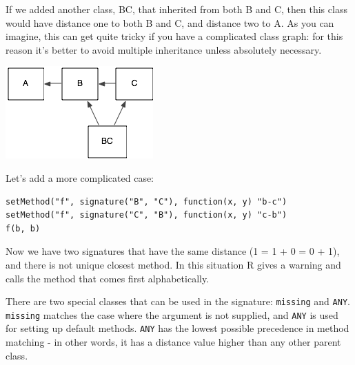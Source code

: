 If we added another class, BC, that inherited from both B and C, then
this class would have distance one to both B and C, and distance two to
A. As you can imagine, this can get quite tricky if you have a
complicated class graph: for this reason it's better to avoid multiple
inheritance unless absolutely necessary.

\includegraphics{diagrams/class-graph-2.png}

\begin{Shaded}
\begin{Highlighting}[]
\NormalTok{(}\NormalTok{, } \NormalTok{(}\NormalTok{, }\NormalTok{))}
\StringTok{ }\NormalTok{(}\NormalTok{, }\NormalTok{)}
\end{Highlighting}
\end{Shaded}

Let's add a more complicated case:

\begin{verbatim}
setMethod("f", signature("B", "C"), function(x, y) "b-c")
setMethod("f", signature("C", "B"), function(x, y) "c-b")
f(b, b)
\end{verbatim}

Now we have two signatures that have the same distance (1 = 1 + 0 = 0 +
1), and there is not unique closest method. In this situation R gives a
warning and calls the method that comes first alphabetically.

There are two special classes that can be used in the signature:
\texttt{missing} and \texttt{ANY}. \texttt{missing} matches the case
where the argument is not supplied, and \texttt{ANY} is used for setting
up default methods. \texttt{ANY} has the lowest possible precedence in
method matching - in other words, it has a distance value higher than
any other parent class.


